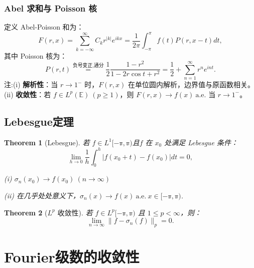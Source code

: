 \documentclass[linespread=1.5,openany]{book}%
\theoremstyle{plain}
\newtheorem{theorem}{Theorem}
\begin{document}
{{{					\subsection{Abel 求和与 Poisson 核}
					{定义 Abel-Poisson 和为：
						\[
						F(r,x) = \sum_{k=-\infty}^{\infty} C_k r^{|k|} e^{ikx} = \frac{1}{2\pi} \int_{-\pi}^{\pi} f(t) P(r, x-t) dt,
						\]
						其中 Poisson 核为：
						\[
						P(r, t) \stackrel{\textbf{负号变正,通分}}{=}\frac{1}{2} \frac{1 - r^2}{1 - 2r\cos t + r^2} =\frac{1}{2}+ \sum_{n=1}^\infty r^{n} e^{int}.
						\]
						注:(i) \textbf{解析性}：当 $r \to 1^-$ 时，$F(r,x)$ 在单位圆内解析，边界值与原函数相关。\\
						(ii) \textbf{收敛性}：若 $f \in L^p(\mathbb{E}) \ (p \geq 1)$，则 $F(r,x) \to f(x) \ \text{a.e.}$ 当 $r \to 1^-$。\\
					}
				}
				{
					\section{Lebesgue定理}
					\begin{theorem}[Lebesgue]
						若 $f \in L^1\mathbb{[-\pi,\pi)}$且$f$ 在 $x_0$ 处满足 Lebesgue 条件：
						\[\lim_{h \to 0} \frac{1}{h} \int_0^h |f(x_0 + t) - f(x_0)| dt = 0,\]
						\item[(i)]
						$\sigma_n(x_0) \to f(x_0) \ (n \to \infty)$
						\item[(ii)]在几乎处处意义下，$\sigma_n(x) \to f(x) \ \text{a.e.} \ x \in \mathbb{[-\pi,\pi)}$.
					\end{theorem}
					\begin{theorem}[$L^p$ 收敛性]
						若 $f \in L^p\mathbb{[-\pi,\pi)}$ 且 $1 \leq p < \infty$，则：
						\[
						\lim_{n \to \infty} \| f - \sigma_n(f) \|_p = 0.
						\]
					\end{theorem}
			}}
			\chapter{Fourier级数的收敛性}{
}}
\end{document}
